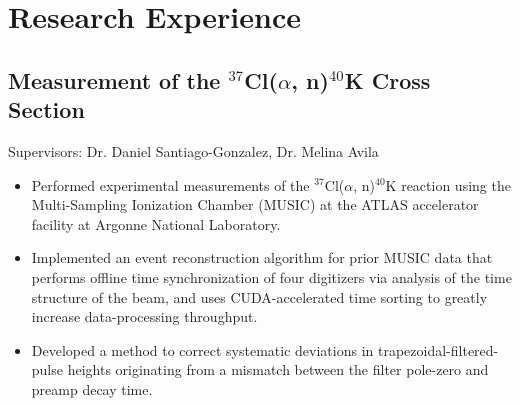 \section{Research Experience}
\subsection{Measurement of the \texorpdfstring{$^{37}$Cl($\alpha$, n)$^{40}$K}{37Cl(alpha,n)40K} Cross Section}\begin{minipage}[t]{\textwidth}
	\begin{small}
		Supervisors: Dr.
		Daniel Santiago-Gonzalez, Dr.
		Melina Avila
		\begin{itemize}
			\item Performed experimental measurements of the $^{37}$Cl($\alpha$, n)$^{40}$K reaction using the Multi-Sampling Ionization Chamber (MUSIC) at the ATLAS accelerator facility at Argonne National Laboratory.
			\item Implemented an event reconstruction algorithm for prior MUSIC data that performs offline time synchronization of four digitizers via analysis of the time structure of the beam, and uses CUDA-accelerated time sorting to greatly increase data-processing throughput.
			\item Developed a method to correct systematic deviations in trapezoidal-filtered-pulse heights originating from a mismatch between the filter pole-zero and preamp decay time.
		\end{itemize}
	\end{small}
\end{minipage}
\pagebreak
\subsection{}
